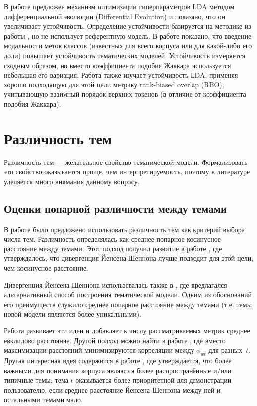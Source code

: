 В работе \cite{agrawal2018wrong} предложен механизм оптимизации гиперпараметров LDA методом дифференциальной эволюции (Differential Evolution) и показано, что он увеличивает устойчивость. Определение устойчивости базируется на методике из работы \cite{greene14howmany}, но не использует референтную модель. В работе \cite{derbanosov} показано, что введение модальности меток классов (известных для всего корпуса или для какой-либо его доли) повышает устойчивость тематических моделей. Устойчивость измеряется сходным образом, но вместо коэффициента подобия Жаккара используется небольшая его вариация. Работа \cite{mantyla2018measuring} также изучает устойчивость LDA, применяя хорошо подходящую для этой цели метрику rank-biased overlap (RBO), учитывающую взаимный порядок верхних токенов (в отличие от  коэффициента подобия Жаккара).

\section{Различность тем}

Различность тем --- желательное свойство тематической модели. Формализовать это свойство оказывается проще, чем интерпретируемость, поэтому в литературе уделяется много внимания данному вопросу.

\subsection{Оценки попарной различности между темами}

В работе \cite{cao2009density} было предложено использовать различность тем как критерий выбора числа тем. Различность определялась как среднее попарное косинусное расстояние между темами. Этот подход получил развитие в работе \cite{deveaud2014accurate}, где утверждалось, что дивергенция Йенсена-Шеннона лучше подходит для этой цели, чем косинусное расстояние.

Дивергенция Йенсена-Шеннона использовалась также в \cite{mimno2011}, где  предлагался альтернативный способ построения тематической модели. Одним из обоснований его преимуществ служило среднее попарное расстояние между темами (т.е. темы новой модели являются более уникальными).

Работа \cite{tang14look} развивает эти идеи и добавляет к числу рассматриваемых метрик среднее евклидово расстояние. Другой подход можно найти в работе \cite{tan2010topic}, где вместо максимизации расстояний минимизируются корреляции между $\phi_{wt}$ для разных~$t$. Другая интересная идея содержится в работе \cite{wang2011topic}, где утверждается, что более важными для понимания корпуса являются более распространённые и/или типичные темы; тема $t$ оказывается более приоритетной для демонстрации пользователю, если среднее расстояние Йенсена-Шеннона между ней и остальными темами мало.

